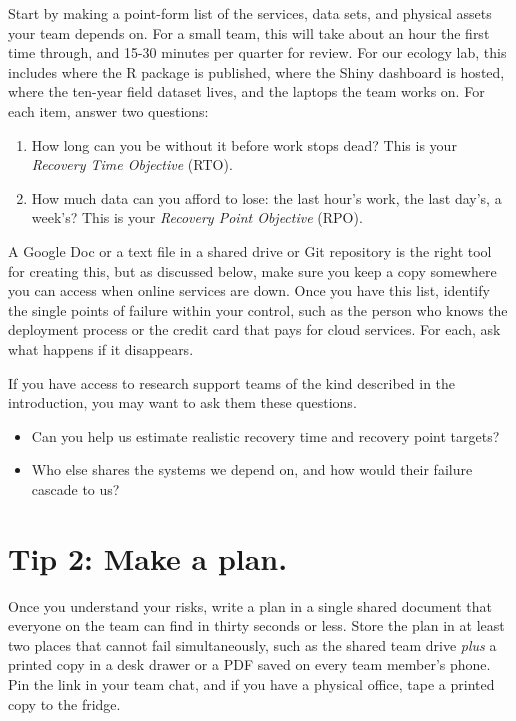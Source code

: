 \documentclass[10pt,letterpaper]{article}
\begin{document}
Start by making a point-form list of the services, data sets, and physical
assets your team depends on.  For a small team, this will take about an hour the
first time through, and 15-30 minutes per quarter for review.  For our ecology
lab, this includes where the R package is published, where the Shiny dashboard
is hosted, where the ten-year field dataset lives, and the laptops the team
works on. For each item, answer two questions:

\begin{enumerate}
  
\item
  How long can you be without it before work stops dead? This is your
  \emph{Recovery Time Objective} (RTO).
  
\item
  How much data can you afford to lose: the last hour's work, the last
  day's, a week's? This is your \emph{Recovery Point Objective} (RPO).
  
\end{enumerate}

A Google Doc or a text file in a shared drive or Git repository is the right
tool for creating this, but as discussed below, make sure you keep a copy
somewhere you can access when online services are down.  Once you have this
list, identify the single points of failure within your control, such as the
person who knows the deployment process or the credit card that pays for cloud
services. For each, ask what happens if it disappears.

\begin{notebox}
  If you have access to research support teams of the kind described in the introduction,
  you may want to ask them these questions.
  \begin{itemize}
  \item Can you help us estimate realistic recovery time and recovery point targets?
  \item Who else shares the systems we depend on, and how would their failure cascade to us?
  \end{itemize}
\end{notebox}

\section*{Tip 2: Make a plan.}

Once you understand your risks, write a plan in a single shared document that
everyone on the team can find in thirty seconds or less. Store the plan in at
least two places that cannot fail simultaneously, such as the shared team drive
\emph{plus} a printed copy in a desk drawer or a PDF saved on every team
member's phone. Pin the link in your team chat, and if you have a physical
office, tape a printed copy to the fridge.
\end{document}
